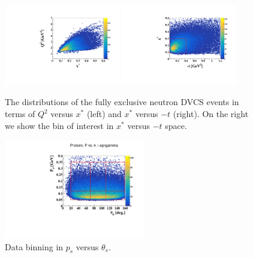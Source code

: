 \begin{figure}[htb]
  \centering
    \includegraphics[width=0.45\textwidth,clip]{figs_epngamma/pdf/epngamma_Q2_x*.pdf}
    \includegraphics[width=0.45\textwidth,clip]{figs_epngamma/pdf/epngamma_t_x*.pdf}
   \caption{The distributions of the fully exclusive neutron DVCS events in 
   terms of $Q^2$ versus $x^*$ (left) and  $x^{*}$ versus $-t$ (right). On the 
   right we show the bin of interest in $x^{*}$ versus $-t$ space.
   \label{fig:exclusive_binning_x_t}}
\end{figure}



\begin{figure}[htb]
  \centering
\includegraphics[width=0.55\textwidth,clip,trim=0mm 0mm 0mm 
   20mm]{figs_epngamma/pdf/epngamma_p_p_theta.pdf}
  \caption{Data binning in $p_s$ versus $\theta_s$.
   \label{fig:ps_binning_x_t}}
\end{figure}

